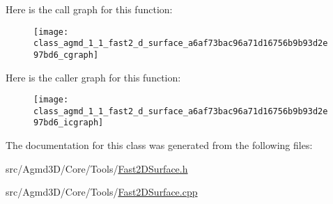 Here is the call graph for this function\+:\nopagebreak
\begin{figure}[H]
\begin{center}
\leavevmode
\texttt{[image: class\_agmd\_1\_1\_fast2\_d\_surface\_a6af73bac96a71d16756b9b93d2e97bd6\_cgraph]}
\end{center}
\end{figure}




Here is the caller graph for this function\+:\nopagebreak
\begin{figure}[H]
\begin{center}
\leavevmode
\texttt{[image: class\_agmd\_1\_1\_fast2\_d\_surface\_a6af73bac96a71d16756b9b93d2e97bd6\_icgraph]}
\end{center}
\end{figure}




The documentation for this class was generated from the following files\+:\begin{DoxyCompactItemize}
\item 
src/\+Agmd3\+D/\+Core/\+Tools/\hyperlink{_fast2_d_surface_8h}{Fast2\+D\+Surface.\+h}\item 
src/\+Agmd3\+D/\+Core/\+Tools/\hyperlink{_fast2_d_surface_8cpp}{Fast2\+D\+Surface.\+cpp}\end{DoxyCompactItemize}
